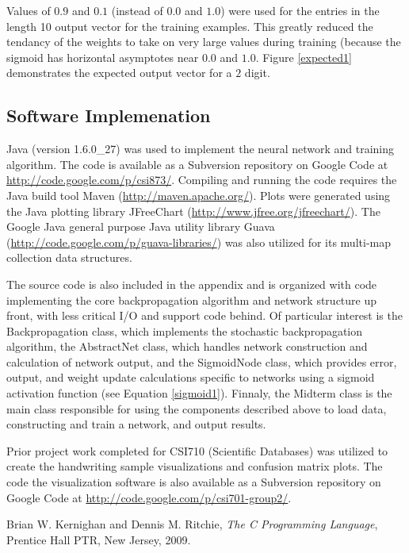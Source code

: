 \documentclass{article}
\begin{document}
Values of \(0.9\) and \(0.1\) (instead of \(0.0\) and \(1.0\)) were used for the entries in the length 10 output vector for the training examples. This greatly reduced the tendancy of the weights to take on very large values during training (because the sigmoid has horizontal asymptotes near \(0.0\) and \(1.0\). Figure \ref{expected1} demonstrates the expected output vector for a \(2\) digit.

\subsection{Software Implemenation}\label{Software Implemenation}

Java (version 1.6.0\_27) was used to implement the neural network and training algorithm. The code is available as a Subversion repository on Google Code at \url{http://code.google.com/p/csi873/}. Compiling and running the code requires the Java build tool Maven (\url{http://maven.apache.org/}). Plots were generated using the Java plotting library JFreeChart (\url{http://www.jfree.org/jfreechart/}). The Google Java general purpose Java utility library Guava (\url{http://code.google.com/p/guava-libraries/}) was also utilized for its multi-map collection data structures.

The source code is also included in the appendix and is organized with code implementing the core backpropagation algorithm and network structure up front, with less critical I/O and support code behind. Of particular interest is the Backpropagation class, which implements the stochastic backpropagation algorithm, the AbstractNet class, which handles network construction and calculation of network output, and the SigmoidNode class, which provides error, output, and weight update calculations specific to networks using a sigmoid activation function (see Equation \ref{sigmoid1}). Finnaly, the Midterm class is the main class responsible for using the components described above to load data, constructing and train a network, and output results.

Prior project work completed for CSI710 (Scientific Databases) was utilized to create the handwriting sample visualizations and confusion matrix plots. The code the visualization software is also available as a Subversion repository on Google Code at \url{http://code.google.com/p/csi701-group2/}.

\begin{thebibliography}{9}

  Brian W. Kernighan and Dennis M. Ritchie,
  \emph{The C Programming Language},
  Prentice Hall PTR, New Jersey,
  2009.

\end{thebibliography}
\end{document}
